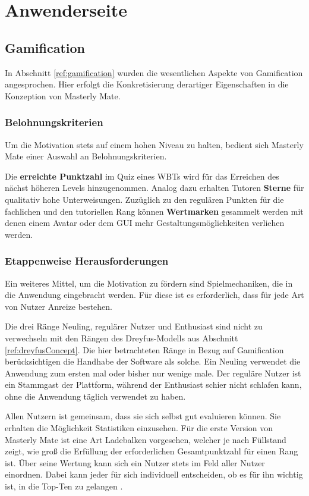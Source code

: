\chapter{Anwenderseite}
\section{Gamification}\label{ref:gamificationConcept}
In Abschnitt \ref{ref:gamification} wurden die wesentlichen Aspekte von
Gamification angesprochen. Hier erfolgt die Konkretisierung derartiger
Eigenschaften in die Konzeption von Masterly Mate.

\subsection{Belohnungskriterien}
Um die Motivation stets auf einem hohen Niveau zu halten, bedient sich Masterly
Mate einer Auswahl an Belohnungskriterien.

Die \textbf{erreichte Punktzahl} im Quiz eines WBTs wird für das Erreichen des
nächst höheren Levels hinzugenommen. Analog dazu erhalten Tutoren
\textbf{Sterne} für qualitativ hohe Unterweisungen. Zuzüglich zu den regulären
Punkten für die fachlichen und den tutoriellen Rang können \textbf{Wertmarken}
gesammelt werden mit denen einem Avatar oder dem \ac{GUI} mehr
Gestaltungsmöglichkeiten verliehen werden.

\subsection{Etappenweise Herausforderungen}
Ein weiteres Mittel, um die Motivation zu fördern sind Spielmechaniken, die in
die Anwendung eingebracht werden. Für diese ist es erforderlich, dass für jede
Art von Nutzer Anreize bestehen. 

Die drei Ränge Neuling, regulärer Nutzer und Enthusiast sind nicht zu
verwechseln mit den Rängen des Dreyfus-Modells aus Abschnitt
\ref{ref:dreyfusConcept}. Die hier betrachteten Ränge in Bezug auf Gamification
berücksichtigen die Handhabe der Software als solche. Ein Neuling verwendet die
Anwendung zum ersten mal oder bisher nur wenige male. Der reguläre Nutzer ist
ein Stammgast der Plattform, während der Enthusiast schier nicht schlafen kann,
ohne die Anwendung täglich verwendet zu haben.

Allen Nutzern ist gemeinsam, dass sie sich selbst gut evaluieren können. Sie
erhalten die Möglichkeit Statistiken einzusehen. Für die erste Version von
Masterly Mate ist eine Art Ladebalken vorgesehen, welcher je nach Füllstand
zeigt, wie groß die Erfüllung der erforderlichen Gesamtpunktzahl für einen Rang
ist. Über seine Wertung kann sich ein Nutzer stets im Feld aller Nutzer
einordnen. Dabei kann jeder für sich individuell entscheiden, ob es für ihn
wichtig ist, in die Top-Ten zu gelangen \cite{grubenMerkeBabics:2012}.

